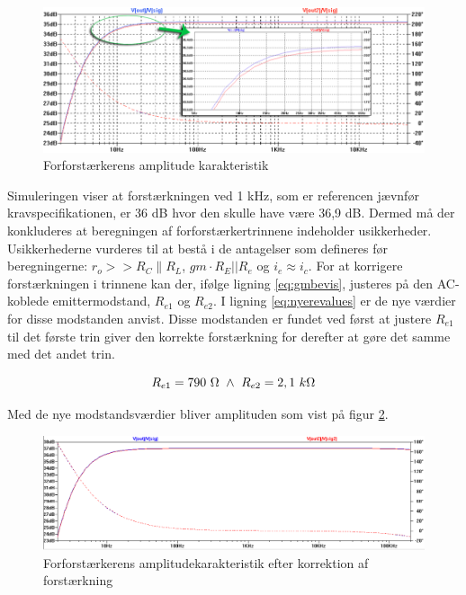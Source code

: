 \begin{figure}[h]
\centering
\includegraphics[scale=.6]{teknisk/forforstaerker/amplitudeforforstaerker.png}
\caption{Forforstærkerens amplitude karakteristik}
\label{fig:amplitude-forforstaerker}
\end{figure}

Simuleringen viser at forstærkningen ved 1 kHz, som er referencen jævnfør kravspecifikationen, er 36 dB hvor den skulle have være 36,9 dB. Dermed må der konkluderes at beregningen af forforstærkertrinnene indeholder usikkerheder. Usikkerhederne vurderes til at bestå i de antagelser som defineres før beregningerne: $r_o >>R_C \| R_L$, $gm \cdot R_E||R_e$ og $i_e \approx i_c$. For at korrigere forstærkningen i trinnene kan der, ifølge ligning \ref{eq:gmbevis}, justeres på den AC-koblede emittermodstand, $R_{e1}$ og $R_{e2}$. I ligning \ref{eq:nyerevalues} er de nye værdier for disse modstanden anvist. Disse modstanden er fundet ved først at justere $R_{e1}$ til det første trin giver den korrekte forstærkning for derefter at gøre det samme med det andet trin.

\begin{equation}
R_{e1}=790~\ohm~\wedge ~R_{e2}=2,1~k\ohm
\label{eq:nyerevalues}
\end{equation}

Med de nye modstandsværdier bliver amplituden som vist på figur \ref{fig:rigtigamplitudeforforstaerker}.

\begin{figure}[h]
\centering
\includegraphics[scale=.6]{teknisk/forforstaerker/rigtigamplitude.png}
\caption{Forforstærkerens amplitudekarakteristik efter korrektion af forstærkning}
\label{fig:rigtigamplitudeforforstaerker}
\end{figure}

